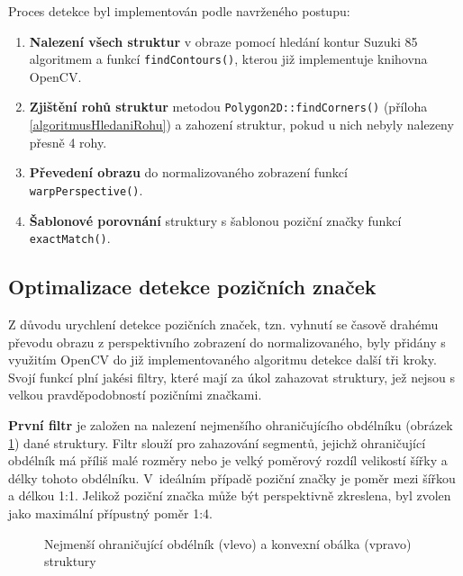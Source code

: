 \bigskip \noindent Proces detekce byl implementován podle navrženého postupu:

\begin{enumerate}
  \item \textbf{Nalezení všech struktur} v obraze pomocí hledání kontur Suzuki
  85 algoritmem a funkcí \texttt{findContours()}, kterou již implementuje
  knihovna OpenCV.
  \item \textbf{Zjištění rohů struktur} metodou
  \texttt{Polygon2D::findCorners()} (příloha \ref{algoritmusHledaniRohu}) a zahození struktur,
  pokud u nich nebyly nalezeny přesně 4 rohy.
  \item \textbf{Převedení obrazu} do normalizovaného zobrazení funkcí
  \texttt{warpPerspective()}.
  \item \textbf{Šablonové porovnání} struktury s šablonou poziční značky funkcí
  \texttt{exactMatch()}.
\end{enumerate}

\subsection{Optimalizace detekce pozičních značek}
\label{optimalizaceDetekce}

Z důvodu urychlení detekce pozičních značek, tzn. vyhnutí se časově drahému převodu obrazu z perspektivního zobrazení do normalizovaného, byly přidány s využitím OpenCV do již implementovaného algoritmu detekce další tři kroky. Svojí funkcí plní jakési filtry, které mají za úkol zahazovat struktury, jež nejsou s velkou pravděpodobností pozičními značkami.

\textbf{První filtr} je založen na nalezení nejmenšího ohraničujícího obdélníku
(obrázek \ref{MinimalBoundedAndConvexHull}) dané struktury. Filtr slouží pro
zahazování segmentů, jejichž ohraničující obdélník má příliš malé rozměry nebo je velký poměrový rozdíl
velikostí šířky a délky tohoto obdélníku. V~ideálním případě poziční značky
je poměr mezi šířkou a délkou 1:1. Jelikož poziční značka může být
perspektivně zkreslena, byl zvolen jako maximální přípustný poměr 1:4.
 
 \begin{figure}[H]
  \begin{center}
    \caption{Nejmenší ohraničující obdélník (vlevo) a konvexní obálka (vpravo)
    struktury}
    \label{MinimalBoundedAndConvexHull}
  \end{center}
\end{figure}

